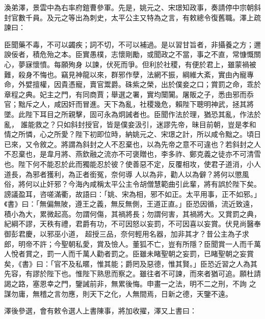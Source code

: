 \begin{pinyinscope}
 渙弟澤，景雲中為右率府鎧曹參軍。先是，姚元之、宋璟知政事，奏請停中宗朝斜封官數千員。及元之等出為刺史，太平公主又特為之言，有敕總令復舊職。澤上疏諫曰：



 臣聞藥不毒，不可以蠲疾；詞不切，不可以補過。是以習甘旨者，非攝養之方；邇諛佞者，積危殆之本。臣實愚樸，志懷剛勵，或聞政之不當，事之不直，常慷慨關心，夢寐懷憤。每願殉身
 以諫，伏死而爭。但利於社稷，有便於君上，雖蒙禍被難，殺身不悔也。竊見神龍以來，群邪作孽，法網不振，綱維大紊，實由內寵專命，外嬖擅權，因貴憑寵，賣官鬻爵。硃紫之榮，出於僕妾之口；賞罰之命，乖於章程之典。妃主之門，有同商賈；舉選之署，實均闤闠。屠販之子，悉由邪而忝官；黜斥之人，咸因奸而冒進。天下為亂，社稷幾危，賴陛下聰明神武，拯其將墜。此陛下耳目之所親擊，固可永為炯誡者也。臣聞作法於理，猶恐其亂，作法於亂，
 誰能救之？只如斜封授官，皆是僕妾汲引，迷謬先帝，昧目前朝，豈是孝和情之所憐，心之所愛？陛下初即位時，納姚元之、宋璟之計，所以咸令黜之。頃日已來，又令敘之。將謂為斜封之人不忍棄也，以為先帝之意不可違也？若斜封之人不忍棄也，是韋月將、燕欽融之流亦不可褒贈也，李多祚、鄭克義之徒亦不可清雪也。陛下何不能忍於此而獨能忍於彼？使善惡不定，反覆相攻，使君子道消，小人道長，為邪者獲利，為正者銜冤，奈何導
 人以為非，勸人以為僻？將何以懲風俗，將何以止奸邪？今海內咸稱太平公主令胡僧慧範曲引此輩，將有誤於陛下矣。謗議盈耳，咨嗟滿衢，故語曰：「姚、宋為相，邪不如正。太平用事，正不如邪。」《書》曰：「無偏無陂，遵王之義，無反無側，王道正直。」臣恐因循，流近致遠，積小為大，累微起高。勿謂何傷，其禍將長；勿謂何害，其禍將大。又賞罰之典，紀綱不謬，天秩有禮，君爵有功，不可因怒以妄罰，不可因喜以妄賞。伏見尚醫奉御彭君慶，以邪巫小道，
 超授三品，奈何輕用名器，加非其才？昔公主為子求郎，明帝不許；今聖朝私愛，賞及憸人。董狐不亡，豈有所隱？臣聞賞一人而千萬人悅者賞之，罰一人而千萬人勸者罰之。臣雖未睹聖朝之妄罰，已睹聖朝之妄賞矣，《書》曰：「官不及私暱，惟其能；爵罔及惡德，惟其賢。」臣恐近習之人為其先容，有謬於陛下也。惟陛下熟思而察之。雖往者不可諫，而來者猶可追。願杜請謁之路，塞恩幸之門，鑒誡前非，無累後悔。申畫一之法，明不二之刑，不詢
 之謀勿庸，無稽之言勿應，則天下之化，人無間焉，日新之德，天鑒不遠。



 澤後參選，會有敕令選人上書陳事，將加收擢，澤又上書曰：




\end{pinyinscope}
